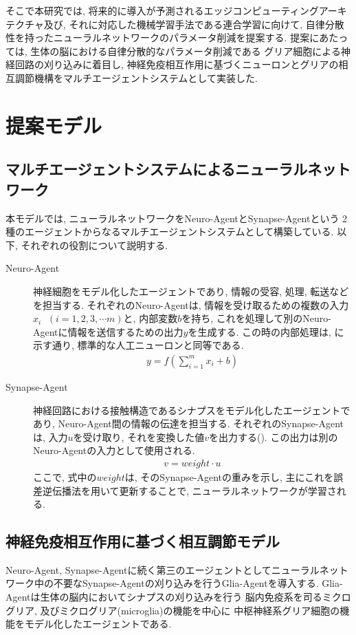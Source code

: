 \documentclass[a4paper,10.5pt,twocolumn]{jsarticle}
\begin{document}
そこで本研究では, 将来的に導入が予測されるエッジコンピューティングアーキテクチャ及び, 
それに対応した機械学習手法である連合学習に向けて, 
自律分散性を持ったニューラルネットワークのパラメータ削減を提案する.
提案にあたっては, 生体の脳における自律分散的なパラメータ削減である
グリア細胞による神経回路の刈り込みに着目し, 
神経免疫相互作用に基づくニューロンとグリアの相互調節機構をマルチエージェントシステムとして実装した.
\section{提案モデル}
\subsection{マルチエージェントシステムによるニューラルネットワーク}
本モデルでは, ニューラルネットワークをNeuro-AgentとSynapse-Agentという
2種のエージェントからなるマルチエージェントシステムとして構築している. 
以下, それぞれの役割について説明する.
\begin{description}
  \item[Neuro-Agent]
  神経細胞をモデル化したエージェントであり, 情報の受容, 処理, 
  転送などを担当する.
  それぞれのNeuro-Agentは, 情報を受け取るための複数の入力$x_i$ $\;(i= 1, 2, 3, \cdots m)$と, 
  内部変数$b$を持ち, 
  これを処理して別のNeuro-Agentに情報を送信するための出力$y$を生成する.
  この時の内部処理は, に示す通り, 標準的な人工ニューロンと同等である.
  \begin{align}
    y=f(\sum_{i=1}^m x_i+b)
    \label{eq:Neuro-Agent}
  \end{align}
  \item[Synapse-Agent]神経回路における接触構造であるシナプスをモデル化したエージェントであり, 
  Neuro-Agent間の情報の伝達を担当する.
  それぞれのSynapse-Agentは, 入力$u$を受け取り, それを変換した値$v$を出力する(). 
  この出力は別のNeuro-Agentの入力として使用される.
  \begin{align}
    v=weight\cdot u
 \label{eq:Synapse-Agent}   
  \end{align}
  ここで, 式中の$weight$は, そのSynapse-Agentの重みを示し, 
  主にこれを誤差逆伝播法を用いて更新することで, ニューラルネットワークが学習される.
\end{description}
\subsection{神経免疫相互作用に基づく相互調節モデル}
Neuro-Agent, Synapse-Agentに続く第三のエージェントとしてニューラルネットワーク中の不要なSynapse-Agentの刈り込みを行うGlia-Agentを導入する. 
Glia-Agentは生体の脳内においてシナプスの刈り込みを行う
脳内免疫系を司るミクログリア, 及びミクログリア(microglia)の機能を中心に
中枢神経系グリア細胞の機能をモデル化したエージェントである.
\end{document}
